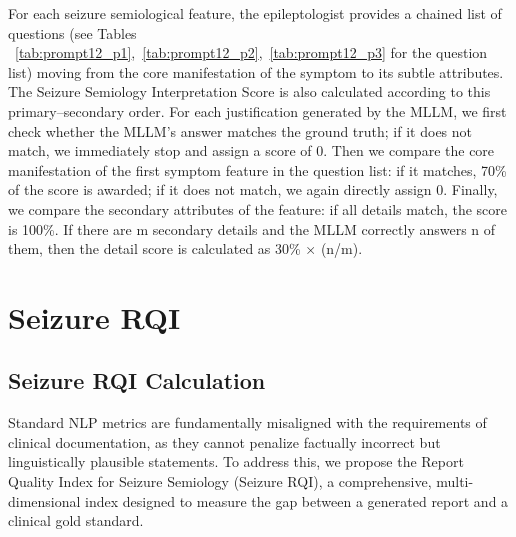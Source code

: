 \documentclass{article}
\theoremstyle{plain}
\theoremstyle{definition}
\theoremstyle{remark}
\begin{document}
For each seizure semiological feature, the epileptologist provides a chained list of questions (see Tables ~\ref{tab:prompt12_p1},~\ref{tab:prompt12_p2},~\ref{tab:prompt12_p3} for the question list) moving from the core manifestation of the symptom to its subtle attributes. The Seizure Semiology Interpretation Score is also calculated according to this primary–secondary order. For each justification generated by the MLLM, we first check whether the MLLM’s answer matches the ground truth; if it does not match, we immediately stop and assign a score of 0. Then we compare the core manifestation of the first symptom feature in the question list: if it matches, 70\% of the score is awarded; if it does not match, we again directly assign 0. Finally, we compare the secondary attributes of the feature: if all details match, the score is 100\%. If there are m secondary details and the MLLM correctly answers n of them, then the detail score is calculated as 30\% × (n/m).

\section{Seizure RQI}
\label{sec:seiz_rqi_supp}

\subsection{Seizure RQI Calculation}
\label{subsec:seiz_rqi_calc_supp}
Standard NLP metrics are fundamentally misaligned with the requirements of clinical documentation, as they cannot penalize factually incorrect but linguistically plausible statements. To address this, we propose the Report Quality Index for Seizure Semiology (Seizure RQI), a comprehensive, multi-dimensional index designed to measure the gap between a generated report and a clinical gold standard.
\end{document}
